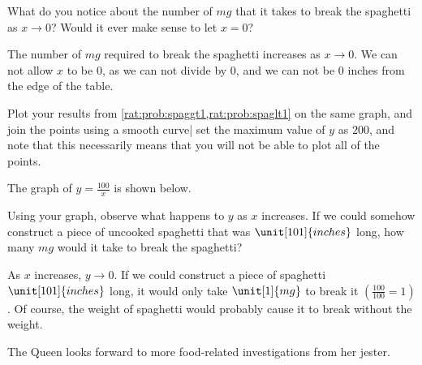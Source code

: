 \begin{problem}
\begin{subproblem}
		 What do you notice about the number of $\unit{mg}$ that it takes to break the spaghetti
		 as $x\rightarrow 0$? Would it ever make sense to let $x=0$?
		 \begin{shortsolution}
			 The number of $\unit{mg}$ required to break the spaghetti increases as $x\rightarrow 0$.
			 We can not allow $x$ to be $0$, as we can not divide by $0$, and we can not
			 be $0$ inches from the edge of the table.
		 \end{shortsolution}
	 \end{subproblem}
	 \begin{subproblem}
		 Plot your results from \cref{rat:prob:spaggt1,rat:prob:spaglt1} on the same graph,
		 and join the points using a smooth curve| set the maximum value of $y$ as $200$, and
		 note that this necessarily means that you will not be able to plot all of the points.
		 \begin{shortsolution}
			 The graph of $y=\frac{100}{x}$ is shown below.

		 \end{shortsolution}
	 \end{subproblem}
	 \begin{subproblem}
		 Using your graph, observe what happens to $y$ as $x$ increases. If we could somehow
		 construct a piece of uncooked spaghetti that was $\unit[101]{inches}$ long, how many
		 $\unit{mg}$ would it take to break the spaghetti?
		 \begin{shortsolution}
			 As $x$ increases, $y\rightarrow 0$. If we could construct a piece of spaghetti
			 $\unit[101]{inches}$ long, it would only take $\unit[1]{mg}$ to break it $\left(\frac{100}{100}=1\right)$. Of course,
			 the weight of spaghetti would probably cause it to break without the weight.
		 \end{shortsolution}
	 \end{subproblem}
	 The Queen looks forward to more food-related investigations from her jester.
	 \end{problem}




